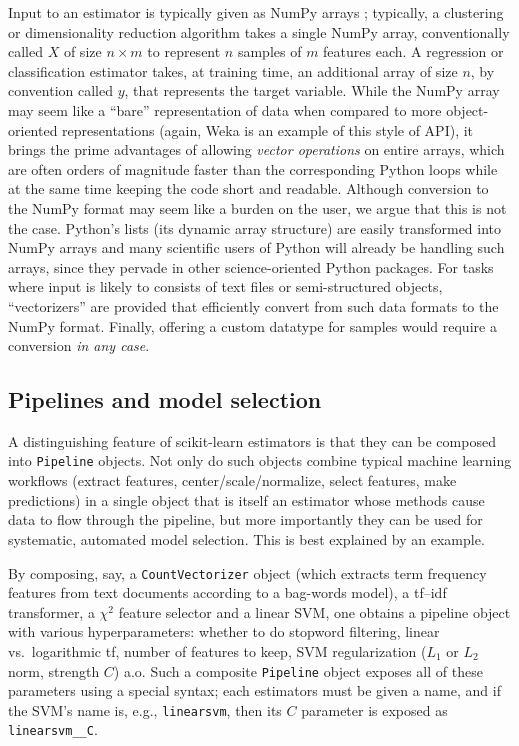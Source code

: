 Input to an estimator is typically given as NumPy arrays \citep{vanderwalt2011};
typically, a clustering or dimensionality reduction algorithm
takes a single NumPy array, conventionally called $X$ of size $n \times m$
to represent $n$ samples of $m$ features each.
A regression or classification estimator takes, at training time,
an additional array of size $n$, by convention called $y$,
that represents the target variable.
While the NumPy array may seem like a ``bare'' representation of data
when compared to more object-oriented representations
(again, Weka is an example of this style of API),
it brings the prime advantages of allowing \textit{vector operations}
on entire arrays,
which are often orders of magnitude faster than the corresponding Python loops
while at the same time keeping the code short and readable.
Although conversion to the NumPy format may seem like a burden on the user,
we argue that this is not the case.
Python's lists (its dynamic array structure)
are easily transformed into NumPy arrays
and many scientific users of Python will already be handling such arrays,
since they pervade in other science-oriented Python packages.
For tasks where input is likely to consists of text files
or semi-structured objects, ``vectorizers'' are provided
that efficiently convert from such data formats to the NumPy format.
Finally, offering a custom datatype for samples
would require a conversion \textit{in any case}.


\subsection{Pipelines and model selection}

A distinguishing feature of scikit-learn estimators
is that they can be composed into \texttt{Pipeline} objects.
Not only do such objects combine typical machine learning workflows
(extract features, center/scale/normalize, select features, 
make predictions) in a single object that is itself an estimator
whose methods cause data to flow through the pipeline,
but more importantly they can be used for
systematic, automated model selection.
This is best explained by an example.

By composing, say, a \texttt{CountVectorizer} object
(which extracts term frequency features from text documents
according to a bag-words model),
a \textsf{tf--idf} transformer, a $\chi^2$ feature selector and a linear SVM,
one obtains a pipeline object with various hyperparameters:
whether to do stopword filtering,
linear vs.\ logarithmic \textsf{tf}, number of features to keep,
SVM regularization ($L_1$ or $L_2$ norm, strength $C$) a.o.
Such a composite \texttt{Pipeline} object
exposes all of these parameters using a special syntax;
each estimators must be given a name,
and if the SVM's name is, e.g., \texttt{linearsvm},
then its $C$ parameter is exposed as \texttt{linearsvm\_\_C}.

